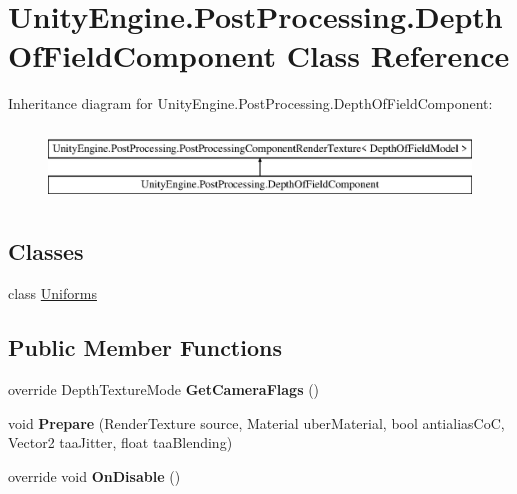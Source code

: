 \hypertarget{class_unity_engine_1_1_post_processing_1_1_depth_of_field_component}{}\section{Unity\+Engine.\+Post\+Processing.\+Depth\+Of\+Field\+Component Class Reference}
\label{class_unity_engine_1_1_post_processing_1_1_depth_of_field_component}
Inheritance diagram for Unity\+Engine.\+Post\+Processing.\+Depth\+Of\+Field\+Component\+:\begin{figure}[H]
\begin{center}
\leavevmode
\includegraphics[height=2.000000cm]{class_unity_engine_1_1_post_processing_1_1_depth_of_field_component}
\end{center}
\end{figure}
\subsection*{Classes}
\begin{DoxyCompactItemize}
\item 
class \hyperlink{class_unity_engine_1_1_post_processing_1_1_depth_of_field_component_1_1_uniforms}{Uniforms}
\end{DoxyCompactItemize}
\subsection*{Public Member Functions}
\begin{DoxyCompactItemize}
\item 
\mbox{\label{class_unity_engine_1_1_post_processing_1_1_depth_of_field_component_ae3e41cb8eaf704a76c63528712d1e6ef}} 
override Depth\+Texture\+Mode {\bfseries Get\+Camera\+Flags} ()
\item 
\mbox{\label{class_unity_engine_1_1_post_processing_1_1_depth_of_field_component_a32180b99bf66ab361b862106862d523c}} 
void {\bfseries Prepare} (Render\+Texture source, Material uber\+Material, bool antialias\+CoC, Vector2 taa\+Jitter, float taa\+Blending)
\item 
\mbox{\label{class_unity_engine_1_1_post_processing_1_1_depth_of_field_component_aec0f639cfc6cbcab6b2ceef5c3de31db}} 
override void {\bfseries On\+Disable} ()
\end{DoxyCompactItemize}
